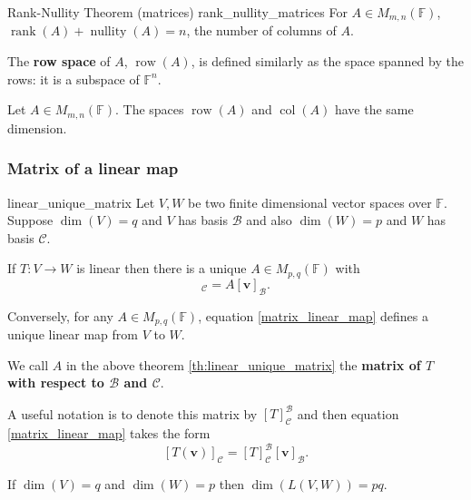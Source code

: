 \begin{theorem}{Rank-Nullity Theorem (matrices) \cite{math2601_notes}}{rank_nullity_matrices}
	For $A \in M_{m,n}(\mathbb{F})$, $\operatorname{rank}(A) + \operatorname{nullity}(A) = n$, the number of columns of $A$.
\end{theorem}

The \textbf{row space} of $A$, $\operatorname{row}(A)$, is defined similarly as the space spanned by the rows: it is a subspace of $\mathbb{F}^n$.

\begin{theorem}{\cite{math2601_notes}}{}
	Let $A \in M_{m,n}(\mathbb{F})$. The spaces $\operatorname{row}(A)$ and $\operatorname{col}(A)$ have the same dimension.
\end{theorem}

\subsubsection{Matrix of a linear map}

\begin{theorem}{\cite{math2601_notes}}{linear_unique_matrix}
	Let $V, W$ be two finite dimensional vector spaces over $\mathbb{F}$. Suppose $\dim (V) = q$ and $V$ has basis $\mathcal{B}$ and also $\dim (W) = p$ and $W$ has basis $\mathcal{C}$.

	If $T : V \to W$ is linear then there is a unique $A \in M_{p,q}(\mathbb{F})$ with
	\begin{equation}
		[T(\mathbf{v})]_{\mathcal{C}} = A [\mathbf{v}]_{\mathcal{B}} . \label{matrix_linear_map}
	\end{equation}

	Conversely, for any $A \in M_{p,q}(\mathbb{F})$, equation \eqref{matrix_linear_map} defines a unique linear map from $V$ to $W$.
\end{theorem}

We call $A$ in the above theorem \ref{th:linear_unique_matrix} the \textbf{matrix of $T$ with respect to $\mathcal{B}$ and $\mathcal{C}$}.

A useful notation is to denote this matrix by $[T]_{\mathcal{C}}^{\mathcal{B}}$ and then equation \eqref{matrix_linear_map} takes the form
$$ [T(\mathbf{v})]_\mathcal{C} = [T]_{\mathcal{C}}^{\mathcal{B}} [\mathbf{v}]_{\mathcal{B}} . $$

\begin{corollary}{\cite{math2601_notes}}{}
	If $\dim (V) = q$ and $\dim (W) = p$ then $\dim (L(V, W)) = pq$.
\end{corollary}


